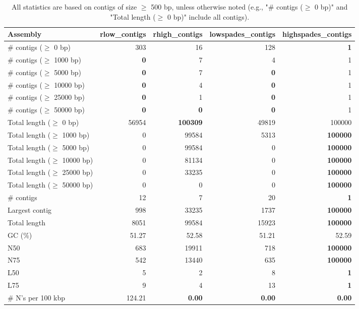 \documentclass[12pt,a4paper]{article}
\begin{document}
\begin{table}[ht]
\begin{center}
\caption{All statistics are based on contigs of size $\geq$ 500 bp, unless otherwise noted (e.g., "\# contigs ($\geq$ 0 bp)" and "Total length ($\geq$ 0 bp)" include all contigs).}
\begin{tabular}{|l*{4}{|r}|}
\hline
Assembly & rlow\_contigs & rhigh\_contigs & lowspades\_contigs & highspades\_contigs \\ \hline
\# contigs ($\geq$ 0 bp) & 303 & 16 & 128 & {\bf 1} \\ \hline
\# contigs ($\geq$ 1000 bp) & {\bf 0} & 7 & 4 & 1 \\ \hline
\# contigs ($\geq$ 5000 bp) & {\bf 0} & 7 & {\bf 0} & 1 \\ \hline
\# contigs ($\geq$ 10000 bp) & {\bf 0} & 4 & {\bf 0} & 1 \\ \hline
\# contigs ($\geq$ 25000 bp) & {\bf 0} & 1 & {\bf 0} & 1 \\ \hline
\# contigs ($\geq$ 50000 bp) & {\bf 0} & {\bf 0} & {\bf 0} & 1 \\ \hline
Total length ($\geq$ 0 bp) & 56954 & {\bf 100309} & 49819 & 100000 \\ \hline
Total length ($\geq$ 1000 bp) & 0 & 99584 & 5313 & {\bf 100000} \\ \hline
Total length ($\geq$ 5000 bp) & 0 & 99584 & 0 & {\bf 100000} \\ \hline
Total length ($\geq$ 10000 bp) & 0 & 81134 & 0 & {\bf 100000} \\ \hline
Total length ($\geq$ 25000 bp) & 0 & 33235 & 0 & {\bf 100000} \\ \hline
Total length ($\geq$ 50000 bp) & 0 & 0 & 0 & {\bf 100000} \\ \hline
\# contigs & 12 & 7 & 20 & {\bf 1} \\ \hline
Largest contig & 998 & 33235 & 1737 & {\bf 100000} \\ \hline
Total length & 8051 & 99584 & 15923 & {\bf 100000} \\ \hline
GC (\%) & 51.27 & 52.58 & 51.21 & 52.59 \\ \hline
N50 & 683 & 19911 & 718 & {\bf 100000} \\ \hline
N75 & 542 & 13440 & 635 & {\bf 100000} \\ \hline
L50 & 5 & 2 & 8 & {\bf 1} \\ \hline
L75 & 9 & 4 & 13 & {\bf 1} \\ \hline
\# N's per 100 kbp & 124.21 & {\bf 0.00} & {\bf 0.00} & {\bf 0.00} \\ \hline
\end{tabular}
\end{center}
\end{table}
\end{document}
